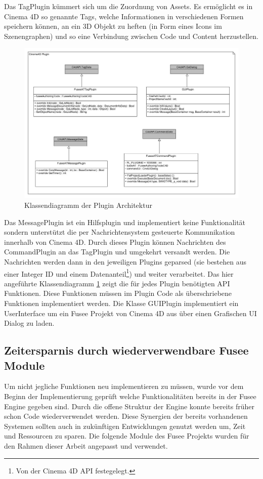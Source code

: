 \documentclass[pagesize, paper=a4, fontsize=12pt, titlepage=true, headings=small, headnosepline, abstractoff, liststotoc, nochapterprefix, plainheadsepline, twoside]{scrreprt}
\begin{document}
Das TagPlugin kümmert sich um die Zuordnung von Assets. Es ermöglicht es in Cinema 4D so genannte Tags, welche Informationen in verschiedenen Formen speichern können, an ein 3D Objekt zu heften (in Form eines Icons im Szenengraphen) und so eine Verbindung zwischen Code und Content herzustellen.
\begin{figure}[ht]
	\centering
	\includegraphics[width=\linewidth]{Bilder/Klassendiagramm_Plugin.jpg}
	\caption{Klassendiagramm der Plugin Architektur}
	\label{KlassendiagrammPluginArchitektur}
\end{figure}
Das MessagePlugin ist ein Hilfsplugin und implementiert keine Funktionalität sondern unterstützt die per Nachrichtensystem gesteuerte Kommunikation innerhalb von Cinema 4D. Durch dieses Plugin können Nachrichten des CommandPlugin an das TagPlugin und umgekehrt versandt werden. Die Nachrichten werden dann in den jeweiligen Plugins geparsed (sie bestehen aus einer Integer ID und einem Datenanteil\footnote{Von der Cinema 4D API festegelegt.}) und weiter verarbeitet. 
Das hier angeführte Klassendiagramm \ref{KlassendiagrammPluginArchitektur} zeigt die für jedes Plugin benötigten API Funktionen. Diese Funktionen müssen im Plugin Code als überschriebene Funktionen implementiert werden. Die Klasse GUIPlugin implementiert ein UserInterface um ein Fusee Projekt von Cinema 4D aus über einen Grafischen UI Dialog zu laden.

\subsection{Zeitersparnis durch wiederverwendbare Fusee Module}
Um nicht jegliche Funktionen neu implementieren zu müssen, wurde vor dem Beginn der Implementierung geprüft welche Funktionalitäten bereits in der Fusee Engine gegeben sind. Durch die offene Struktur der Engine konnte bereits früher schon Code wiederverwendet werden. Diese Synergien der bereits vorhandenen Systemen sollten auch in zukünftigen Entwicklungen genutzt werden um, Zeit und Ressourcen zu sparen.
Die folgende Module des Fusee Projekts wurden für den Rahmen dieser Arbeit angepasst und verwendet.
\end{document}
